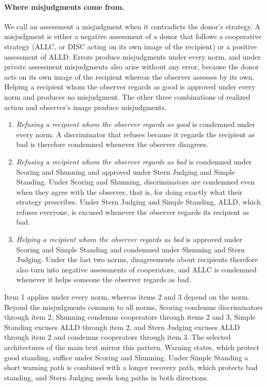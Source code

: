 \documentclass[10pt]{wlscirep}
\theoremstyle{plain}
\theoremstyle{remark}
\begin{document}
\paragraph{Where misjudgments come from.} We call an assessment a misjudgment when it contradicts the donor's strategy. A misjudgment is either a negative assessment of a donor that follows a cooperative strategy (ALLC, or DISC acting on its own image of the recipient) or a positive assessment of ALLD. Errors produce misjudgments under every norm, and under private assessment misjudgments also arise without any error, because the donor acts on its own image of the recipient whereas the observer assesses by its own. Helping a recipient whom the observer regards as good is approved under every norm and produces no misjudgment. The other three combinations of realized action and observer's image produce misjudgments.
\begin{enumerate}
\item \textit{Refusing a recipient whom the observer regards as good} is condemned under every norm. A discriminator that refuses because it regards the recipient as bad is therefore condemned whenever the observer disagrees.
\item \textit{Refusing a recipient whom the observer regards as bad} is condemned under Scoring and Shunning and approved under Stern Judging and Simple Standing. Under Scoring and Shunning, discriminators are condemned even when they agree with the observer, that is, for doing exactly what their strategy prescribes. Under Stern Judging and Simple Standing, ALLD, which refuses everyone, is excused whenever the observer regards its recipient as bad.
\item \textit{Helping a recipient whom the observer regards as bad} is approved under Scoring and Simple Standing and condemned under Shunning and Stern Judging. Under the last two norms, disagreements about recipients therefore also turn into negative assessments of cooperators, and ALLC is condemned whenever it helps someone the observer regards as bad.
\end{enumerate}
Item 1 applies under every norm, whereas items 2 and 3 depend on the norm. Beyond the misjudgments common to all norms, Scoring condemns discriminators through item 2, Shunning condemns cooperators through items 2 and 3, Simple Standing excuses ALLD through item 2, and Stern Judging excuses ALLD through item 2 and condemns cooperators through item 3. The selected architectures of the main text mirror this pattern. Warning states, which protect good standing, suffice under Scoring and Shunning. Under Simple Standing a short warning path is combined with a longer recovery path, which protects bad standing, and Stern Judging needs long paths in both directions.
\end{document}
